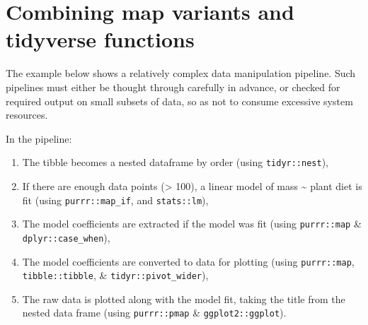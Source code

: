 \documentclass[]{book}
\newenvironment{Shaded}{}{}
\newcommand{\CommentTok}[1]{\textcolor[rgb]{0.38,0.63,0.69}{\textit{#1}}}
\newcommand{\ControlFlowTok}[1]{\textcolor[rgb]{0.00,0.44,0.13}{\textbf{#1}}}
\newcommand{\DecValTok}[1]{\textcolor[rgb]{0.25,0.63,0.44}{#1}}
\newcommand{\KeywordTok}[1]{\textcolor[rgb]{0.00,0.44,0.13}{\textbf{#1}}}
\newcommand{\NormalTok}[1]{#1}
\newcommand{\OperatorTok}[1]{\textcolor[rgb]{0.40,0.40,0.40}{#1}}
\newcommand{\StringTok}[1]{\textcolor[rgb]{0.25,0.44,0.63}{#1}}
\providecommand{\tightlist}{%
  \setlength{\itemsep}{0pt}\setlength{\parskip}{0pt}}
\begin{document}
\begin{Shaded}
\end{Shaded}

\hypertarget{combining-map-variants-and-tidyverse-functions}{%
\section{Combining map variants and tidyverse functions}\label{combining-map-variants-and-tidyverse-functions}}

The example below shows a relatively complex data manipulation pipeline.
Such pipelines must either be thought through carefully in advance, or checked for required output on small subsets of data, so as not to consume excessive system resources.

In the pipeline:

\begin{enumerate}
\def\labelenumi{\arabic{enumi}.}
\tightlist
\item
  The tibble becomes a nested dataframe by order (using \texttt{tidyr::nest}),
\item
  If there are enough data points (\textgreater{} 100), a linear model of mass \textasciitilde{} plant diet is fit (using \texttt{purrr::map\_if}, and \texttt{stats::lm}),
\item
  The model coefficients are extracted if the model was fit (using \texttt{purrr::map} \& \texttt{dplyr::case\_when}),
\item
  The model coefficients are converted to data for plotting (using \texttt{purrr::map}, \texttt{tibble::tibble}, \& \texttt{tidyr::pivot\_wider}),
\item
  The raw data is plotted along with the model fit, taking the title from the nested data frame (using \texttt{purrr::pmap} \& \texttt{ggplot2::ggplot}).
\end{enumerate}
\end{document}

